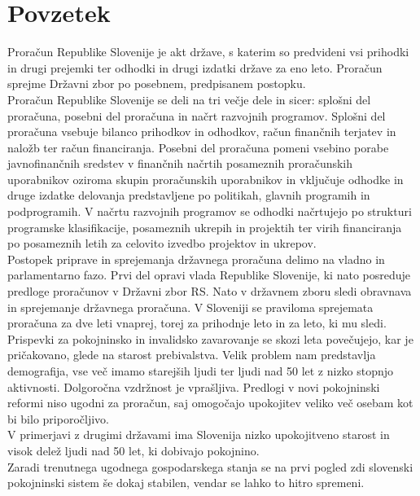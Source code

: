 \documentclass[12pt, a4paper]{article}
\begin{document}
\section*{Povzetek}
\hspace*{5mm} Proračun Republike Slovenije je akt države, s katerim so predvideni vsi prihodki in drugi prejemki ter odhodki in drugi izdatki države za eno leto. Proračun sprejme Državni zbor po posebnem, predpisanem postopku. \\
\hspace*{5mm} Proračun Republike Slovenije se deli na tri večje dele in sicer: splošni del proračuna, posebni del proračuna in načrt razvojnih programov. Splošni del proračuna vsebuje bilanco prihodkov in odhodkov, račun finančnih terjatev in naložb ter račun financiranja. Posebni del proračuna pomeni vsebino porabe javnofinančnih sredstev v finančnih načrtih posameznih proračunskih uporabnikov oziroma skupin proračunskih uporabnikov in vključuje odhodke in druge izdatke delovanja predstavljene po politikah, glavnih programih in podprogramih.  V načrtu razvojnih programov se odhodki načrtujejo po strukturi programske klasifikacije, posameznih ukrepih in projektih ter virih financiranja po posameznih letih za celovito izvedbo projektov in ukrepov. \\
\hspace*{5mm} Postopek priprave in sprejemanja državnega proračuna delimo na vladno in parlamentarno fazo. Prvi del opravi vlada Republike Slovenije, ki nato posreduje predloge proračunov v Državni zbor RS. Nato v državnem zboru sledi obravnava in sprejemanje državnega proračuna. V Sloveniji se praviloma sprejemata proračuna za dve leti vnaprej, torej za prihodnje leto in za leto, ki mu sledi. \\
\hspace*{5mm} Prispevki za pokojninsko in invalidsko zavarovanje se skozi leta povečujejo, kar je pričakovano, glede na starost prebivalstva. Velik problem nam predstavlja demografija, vse več imamo starejših ljudi ter ljudi nad 50 let z nizko stopnjo aktivnosti. Dolgoročna vzdržnost je vprašljiva. Predlogi v novi pokojninski reformi niso ugodni za proračun, saj omogočajo upokojitev veliko več osebam kot bi bilo priporočljivo. \\
\hspace*{5mm} V primerjavi z drugimi državami ima Slovenija nizko upokojitveno starost in visok delež ljudi nad 50 let, ki dobivajo pokojnino.\\
\hspace*{5mm} Zaradi trenutnega ugodnega gospodarskega stanja se na prvi pogled zdi slovenski pokojninski sistem še dokaj stabilen, vendar se lahko to hitro spremeni.
\end{document}
